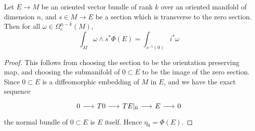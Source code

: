 \begin{cor} \label{cor:vb_localisation} %
	Let $E\to M$ be an oriented vector bundle of rank $k$ over an oriented 
	manifold of dimension $n$, 
	and $s\in M\to E$ be a section which is transverse to the zero section.
	Then for all $\omega\in \Omega^{n-k}_c(M)$,
	\[
	\int_M \omega \wedge s^* \Phi(E) =\int_{s^{-1}(0)} i^*\omega  
	\] 
\end{cor}
\begin{proof}
	This follows from choosing the section to be the orientation preserving map, and
	choosing the submanifold of $0\subset E$ to be the image of the zero section.
	Since $0\subset E$ is a diffeomorphic embedding of $M$ in $E$, and we have the
	exact sequence
\[
	\begin{tikzcd}[column sep = 1.6em]
		0 \arrow[r] & T0 \arrow[r] & TE|_0 \arrow[r] 
						& E \arrow[r] & 0
	\end{tikzcd}
	\]
	the normal bundle of  $0\subset E$ is  $E$ itself.
	Hence $\eta_0 = \Phi(E)$. 
\end{proof}


